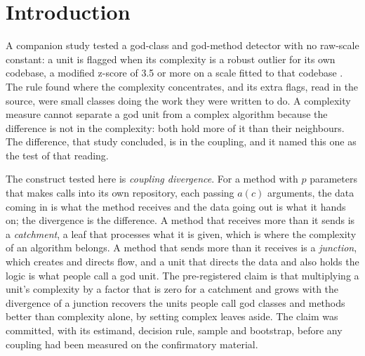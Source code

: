 \documentclass[11pt,a4paper]{article}
\begin{document}
\section{Introduction}

A companion study \cite{paperone} tested a god-class and god-method
detector with no raw-scale constant: a unit is flagged when its complexity
is a robust outlier for its own codebase, a modified z-score of 3.5 or more
on a scale fitted to that codebase \cite{iglewicz1993}. The rule found where
the complexity concentrates, and its extra flags, read in the source, were
small classes doing the work they were written to do. A complexity measure
cannot separate a god unit from a complex algorithm because the difference
is not in the complexity: both hold more of it than their neighbours. The
difference, that study concluded, is in the coupling, and it named this one
as the test of that reading.

The construct tested here is \emph{coupling divergence}. For a method with
$p$ parameters that makes calls into its own repository, each passing
$a(c)$ arguments, the data coming in is what the method receives and the
data going out is what it hands on; the divergence is the difference. A
method that receives more than it sends is a \emph{catchment}, a leaf that
processes what it is given, which is where the complexity of an algorithm
belongs. A method that sends more than it receives is a \emph{junction},
which creates and directs flow, and a unit that directs the data and also
holds the logic is what people call a god unit. The pre-registered claim is
that multiplying a unit's complexity by a factor that is zero for a
catchment and grows with the divergence of a junction recovers the units
people call god classes and methods better than complexity alone, by
setting complex leaves aside. The claim was committed, with its estimand,
decision rule, sample and bootstrap, before any coupling had been measured
on the confirmatory material.
\end{document}
